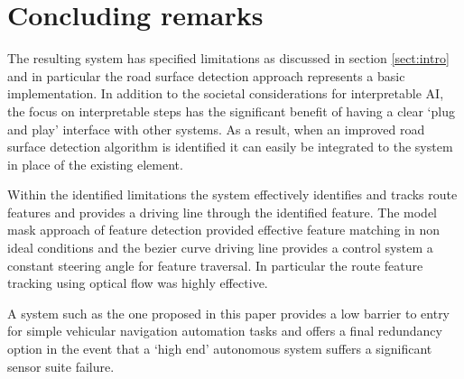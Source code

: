 \documentclass[]{aiaa-tc}%
\begin{document}
\section{Concluding remarks}

The resulting system has specified limitations as discussed in section \ref{sect:intro} and in particular the road surface detection approach represents a basic implementation. In addition to the societal considerations for interpretable AI, the focus on interpretable steps has the significant benefit of having a clear `plug and play' interface with other systems. As a result, when an improved road surface detection algorithm is identified it can easily be integrated to the system in place of the existing element. 

Within the identified limitations the system effectively identifies and tracks route features and provides a driving line through the identified feature. The model mask approach of feature detection provided effective feature matching in non ideal conditions and the bezier curve driving line provides a control system a constant steering angle for feature traversal. In particular the route feature tracking using optical flow was highly effective. 

A system such as the one proposed in this paper provides a low barrier to entry for simple vehicular navigation automation tasks and offers a final redundancy option in the event that a `high end' autonomous system suffers a significant sensor suite failure.


\newpage
\end{document}
